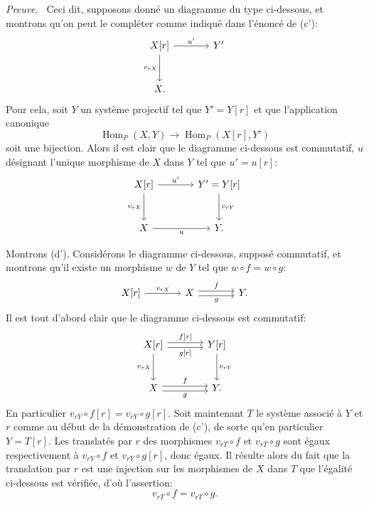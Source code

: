 \documentclass[11pt]{article}
\newenvironment{prooftext}[1][Proof]{\par\noindent\emph{#1.}\ }{\par\medskip}
\DeclareMathOperator{\Hom}{Hom}
\providecommand{\Hom}{\operatorname{Hom}}
\providecommand{\Hom}{\operatorname{Hom}}
\begin{document}
\begin{prooftext}[Preuve]
Ceci dit, supposons donné un diagramme du type ci-dessous, et montrons qu'on peut le compléter comme indiqué dans l'énoncé de (c'):
\[
\begin{tikzcd}[column sep=large,row sep=large]
X[r] \arrow[r,"u'"] \arrow[d,"{v_{rX}}"'] & Y'\\
X .
\end{tikzcd}
\]
Pour cela, soit $Y$ un système projectif tel que $Y'=Y[r]$ et que l'application canonique
\[
\Hom_P(X,Y)\longrightarrow\Hom_P(X[r],Y')
\]
soit une bijection. Alors il est clair que le diagramme ci-dessous est commutatif, $u$ désignant l'unique morphisme de $X$ dans $Y$ tel que $u'=u[r]$:
\[
\begin{tikzcd}[column sep=large,row sep=large]
X[r] \arrow[r,"u'"] \arrow[d,"{v_{rX}}"'] & Y'=Y[r] \arrow[d,"{v_{rY}}"]\\
X \arrow[r,"u"'] & Y .
\end{tikzcd}
\]

Montrons (d'). Considérons le diagramme ci-dessous, supposé commutatif, et montrons qu'il existe un morphisme $w$ de $Y$ tel que $w\circ f=w\circ g$:
\[
\begin{tikzcd}[column sep=large]
X[r] \arrow[r,"{v_{rX}}"] & X \arrow[r,shift left,"f"] \arrow[r,shift right,"g"'] & Y .
\end{tikzcd}
\]
Il est tout d'abord clair que le diagramme ci-dessous est commutatif:
\[
\begin{tikzcd}[column sep=large,row sep=large]
X[r] \arrow[r,shift left,"{f[r]}"] \arrow[r,shift right,"{g[r]}"'] \arrow[d,"{v_{rX}}"'] & Y[r] \arrow[d,"{v_{rY}}"]\\
X \arrow[r,shift left,"f"] \arrow[r,shift right,"g"'] & Y .
\end{tikzcd}
\]
En particulier $v_{rY}\circ f[r]=v_{rY}\circ g[r]$. Soit maintenant $T$ le système associé à $Y$ et $r$ comme au début de la démonstration de (c'), de sorte qu'en particulier $Y=T[r]$. Les translatés par $r$ des morphismes $v_{rT}\circ f$ et $v_{rT}\circ g$ sont égaux respectivement à $v_{rY}\circ f$ et $v_{rY}\circ g[r]$, donc égaux. Il résulte alors du fait que la translation par $r$ est une injection sur les morphismes de $X$ dans $T$ que l'égalité ci-dessous est vérifiée, d'où l'assertion:
\[
v_{rT}\circ f=v_{rT}\circ g.
\]
\end{prooftext}
\end{document}
